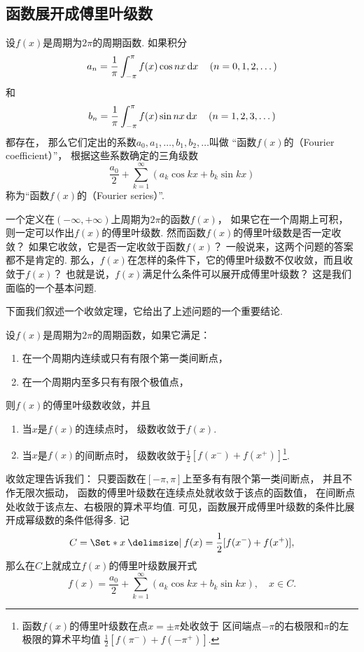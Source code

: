 \subsection{函数展开成傅里叶级数}
\begin{definition}\label{definition:无穷级数.傅里叶级数}
设\(f(x)\)是周期为\(2 \pi\)的周期函数.
如果积分\[
a_n = \frac{1}{\pi} \int_{-\pi}^{\pi} f(x) \cos nx \dd{x} \quad(n=0,1,2,\dotsc)
\]和\[
b_n = \frac{1}{\pi} \int_{-\pi}^{\pi} f(x) \sin nx \dd{x} \quad(n=1,2,3,\dotsc)
\]都存在，
那么它们定出的系数\(a_0,a_1,\dotsc,b_1,b_2,\dotsc\)叫做%
“函数\(f(x)\)的（Fourier coefficient）”，
根据这些系数确定的三角级数\[
\frac{a_0}{2} + \sum\limits_{k=1}^\infty (a_k \cos{kx} + b_k \sin kx)
\]称为“函数\(f(x)\)的（Fourier series）”.
\end{definition}

一个定义在\((-\infty,+\infty)\)上周期为\(2\pi\)的函数\(f(x)\)，
如果它在一个周期上可积，
则一定可以作出\(f(x)\)的傅里叶级数.
然而函数\(f(x)\)的傅里叶级数是否一定收敛？
如果它收敛，它是否一定收敛于函数\(f(x)\)？
一般说来，这两个问题的答案都不是肯定的.
那么，\(f(x)\)在怎样的条件下，它的傅里叶级数不仅收敛，而且收敛于\(f(x)\)？
也就是说，\(f(x)\)满足什么条件可以展开成傅里叶级数？
这是我们面临的一个基本问题.

下面我们叙述一个收敛定理，它给出了上述问题的一个重要结论.
\begin{theorem}\label{theorem:无穷级数.傅里叶级数收敛的狄利克雷充分条件}
设\(f(x)\)是周期为\(2 \pi\)的周期函数，如果它满足：
\begin{enumerate}
\item 在一个周期内连续或只有有限个第一类间断点，
\item 在一个周期内至多只有有限个极值点，
\end{enumerate}
则\(f(x)\)的傅里叶级数收敛，并且
\begin{enumerate}
\item 当\(x\)是\(f(x)\)的连续点时，
级数收敛于\(f(x)\).

\item 当\(x\)是\(f(x)\)的间断点时，
级数收敛于\(\frac{1}{2} [ f(x^-) + f(x^+) ]\)\footnote{%
函数\(f(x)\)的傅里叶级数在点\(x=\pm\pi\)处收敛于%
区间端点\(-\pi\)的右极限和\(\pi\)的左极限的算术平均值%
\(\frac{1}{2} [ f(\pi^-) + f(-\pi^+) ]\).}.
\end{enumerate}
\end{theorem}

收敛定理告诉我们：
只要函数在\([-\pi,\pi]\)上至多有有限个第一类间断点，
并且不作无限次振动，
函数的傅里叶级数在连续点处就收敛于该点的函数值，
在间断点处收敛于该点左、右极限的算术平均值.
可见，函数展开成傅里叶级数的条件比展开成幂级数的条件低得多.
记
\begin{equation}
C = \Set*{
	x \given
	f(x) = \frac{1}{2} [ f(x^-) + f(x^+) ]
},
\end{equation}
那么在\(C\)上就成立\(f(x)\)的傅里叶级数展开式\[
f(x) = \frac{a_0}{2} + \sum\limits_{k=1}^\infty (a_k \cos{kx} + b_k \sin kx),
\quad x \in C.
\]

